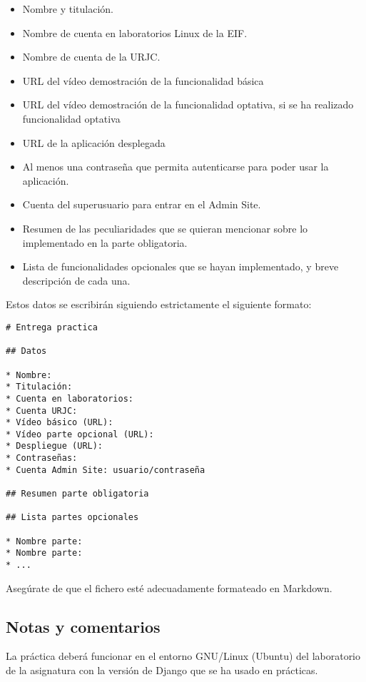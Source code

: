 \begin{itemize}
\begin{itemize}
  \item Nombre y titulación.
  \item Nombre de cuenta en laboratorios Linux de la EIF.
  \item Nombre de cuenta de la URJC.
  \item URL del vídeo demostración de la funcionalidad básica
  \item URL del vídeo demostración de la funcionalidad optativa, si se ha realizado funcionalidad optativa
  \item URL de la aplicación desplegada
  \item Al menos una contraseña que permita autenticarse para poder usar la aplicación.
  \item Cuenta del superusuario para entrar en el Admin Site.
  \item Resumen de las peculiaridades que se quieran mencionar sobre lo implementado en la parte obligatoria.
  \item Lista de funcionalidades opcionales que se hayan implementado, y breve descripción de cada una.
\end{itemize}

Estos datos se escribirán siguiendo estrictamente el siguiente formato:

\begin{verbatim}
# Entrega practica

## Datos

* Nombre:
* Titulación:
* Cuenta en laboratorios:
* Cuenta URJC:
* Vídeo básico (URL):
* Vídeo parte opcional (URL):
* Despliegue (URL):
* Contraseñas:
* Cuenta Admin Site: usuario/contraseña

## Resumen parte obligatoria

## Lista partes opcionales

* Nombre parte:
* Nombre parte:
* ...
\end{verbatim}

Asegúrate de que el fichero esté adecuadamente formateado en Markdown.
\end{itemize}


\subsection{Notas y comentarios}

La práctica deberá funcionar en el entorno GNU/Linux (Ubuntu) del laboratorio de la asignatura con la versión de Django que se ha usado en prácticas.

